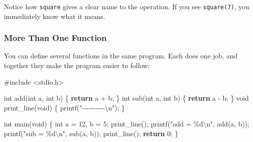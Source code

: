 \documentclass[
  letterpaper,
  DIV=11,
  numbers=noendperiod]{scrreprt}
\newenvironment{Shaded}{\begin{snugshade}}{\end{snugshade}}
\newcommand{\ControlFlowTok}[1]{\textcolor[rgb]{0.00,0.23,0.31}{\textbf{#1}}}
\newcommand{\DataTypeTok}[1]{\textcolor[rgb]{0.68,0.00,0.00}{#1}}
\newcommand{\DecValTok}[1]{\textcolor[rgb]{0.68,0.00,0.00}{#1}}
\newcommand{\ImportTok}[1]{\textcolor[rgb]{0.00,0.46,0.62}{#1}}
\newcommand{\NormalTok}[1]{\textcolor[rgb]{0.00,0.23,0.31}{#1}}
\newcommand{\OperatorTok}[1]{\textcolor[rgb]{0.37,0.37,0.37}{#1}}
\newcommand{\PreprocessorTok}[1]{\textcolor[rgb]{0.68,0.00,0.00}{#1}}
\newcommand{\SpecialCharTok}[1]{\textcolor[rgb]{0.37,0.37,0.37}{#1}}
\newcommand{\StringTok}[1]{\textcolor[rgb]{0.13,0.47,0.30}{#1}}
\begin{document}
Notice how \texttt{square} gives a clear name to the operation. If you
see \texttt{square(7)}, you immediately know what it means.

\subsubsection{More Than One Function}\label{more-than-one-function}

You can define several functions in the same program. Each does one job,
and together they make the program easier to follow:

\begin{Shaded}
\begin{Highlighting}[]
\PreprocessorTok{\#include }\ImportTok{\textless{}stdio.h\textgreater{}}

\DataTypeTok{int}\NormalTok{ add}\OperatorTok{(}\DataTypeTok{int}\NormalTok{ a}\OperatorTok{,} \DataTypeTok{int}\NormalTok{ b}\OperatorTok{)} \OperatorTok{\{} \ControlFlowTok{return}\NormalTok{ a }\OperatorTok{+}\NormalTok{ b}\OperatorTok{;} \OperatorTok{\}}
\DataTypeTok{int}\NormalTok{ sub}\OperatorTok{(}\DataTypeTok{int}\NormalTok{ a}\OperatorTok{,} \DataTypeTok{int}\NormalTok{ b}\OperatorTok{)} \OperatorTok{\{} \ControlFlowTok{return}\NormalTok{ a }\OperatorTok{{-}}\NormalTok{ b}\OperatorTok{;} \OperatorTok{\}}
\DataTypeTok{void}\NormalTok{ print\_line}\OperatorTok{(}\DataTypeTok{void}\OperatorTok{)} \OperatorTok{\{}\NormalTok{ printf}\OperatorTok{(}\StringTok{"{-}{-}{-}{-}{-}{-}{-}{-}{-}{-}}\SpecialCharTok{\textbackslash{}n}\StringTok{"}\OperatorTok{);} \OperatorTok{\}}

\DataTypeTok{int}\NormalTok{ main}\OperatorTok{(}\DataTypeTok{void}\OperatorTok{)} \OperatorTok{\{}
    \DataTypeTok{int}\NormalTok{ a }\OperatorTok{=} \DecValTok{12}\OperatorTok{,}\NormalTok{ b }\OperatorTok{=} \DecValTok{5}\OperatorTok{;}
\NormalTok{    print\_line}\OperatorTok{();}
\NormalTok{    printf}\OperatorTok{(}\StringTok{"add = }\SpecialCharTok{\%d\textbackslash{}n}\StringTok{"}\OperatorTok{,}\NormalTok{ add}\OperatorTok{(}\NormalTok{a}\OperatorTok{,}\NormalTok{ b}\OperatorTok{));}
\NormalTok{    printf}\OperatorTok{(}\StringTok{"sub = }\SpecialCharTok{\%d\textbackslash{}n}\StringTok{"}\OperatorTok{,}\NormalTok{ sub}\OperatorTok{(}\NormalTok{a}\OperatorTok{,}\NormalTok{ b}\OperatorTok{));}
\NormalTok{    print\_line}\OperatorTok{();}
    \ControlFlowTok{return} \DecValTok{0}\OperatorTok{;}
\OperatorTok{\}}
\end{Highlighting}
\end{Shaded}
\end{document}
